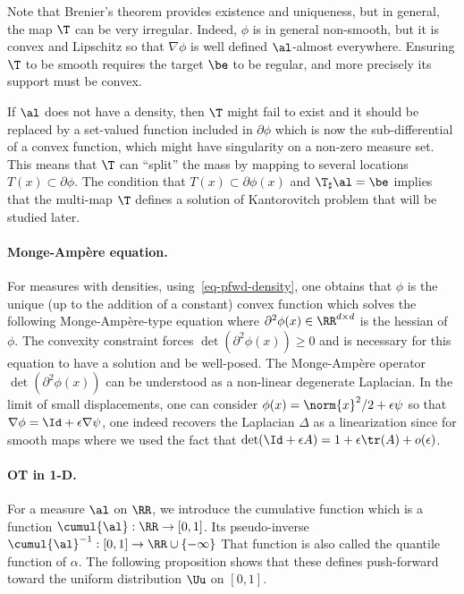 Note that Brenier's theorem provides existence and uniqueness, but in general, the map $\T$ can be very irregular. 
%
Indeed, $\phi$ is in general non-smooth, but it is convex and Lipschitz so that $\nabla \phi$ is well defined $\al$-almost everywhere. Ensuring $\T$ to be smooth requires the target $\be$ to be regular, and more precisely its support must be convex.

If $\al$ does not have a density, then $\T$ might fail to exist and it should be replaced by a set-valued function included in $\partial\phi$ which is now the sub-differential of a convex function, which might have singularity on a non-zero measure set. This means that $\T$ can ``split'' the mass by mapping to several locations  $T(x) \subset \partial\phi$. The condition that $T(x) \subset \partial\phi(x)$ and $\T_\sharp \al=\be$ implies that the multi-map $\T$ defines a solution of Kantorovitch problem that will be studied later. 


\paragraph{Monge-Amp\`ere equation.}

For measures with densities, using~\eqref{eq-pfwd-density}, one obtains that $\phi$ is the unique (up to the addition of a constant) convex function which solves the following Monge-Amp\`ere-type equation
where $\partial^2\phi(x) \in \RR^{\dims \times \dims}$ is the hessian of $\phi$. 
%
The convexity constraint forces $\det(\partial^2\phi(x)) \geq 0$ and is necessary for this equation to have a solution and be well-posed. 
%
The Monge-Amp\`ere operator $\det(\partial^2\phi(x))$ can be understood as a non-linear degenerate Laplacian. In the limit of small displacements, one can consider $\phi(x)=\norm{x}^2/2 + \epsilon\psi$ so that $\nabla \phi = \Id+\epsilon \nabla \psi$, one indeed recovers the Laplacian $\Delta$ as a linearization since for smooth maps
where we used the fact that $\det(\Id+\epsilon A) = 1+\epsilon\tr(A)+o(\epsilon)$. 



\paragraph{OT in 1-D.}

For a measure $\al$ on $\RR$, we introduce the cumulative function
which is a function $\cumul{\al} : \RR \rightarrow [0,1]$.
%
Its pseudo-inverse  $\cumul{\al}^{-1} : [0,1] \rightarrow \RR \cup \{-\infty\}$ 
That function is also called the quantile function of $\alpha$. 
%
The following proposition shows that these defines push-forward toward the uniform distribution $\Uu$ on $[0,1]$.

